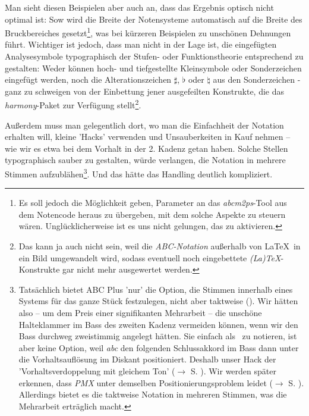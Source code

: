 Man sieht diesen Beispielen aber auch an, dass das Ergebnis optisch nicht
optimal ist: Sow wird die Breite der Notensysteme automatisch auf die Breite des
Bruckbereiches gesetzt\footnote{Es soll jedoch die Möglichkeit geben, Parameter
an das \textit{abcm2ps}-Tool aus dem Notencode heraus zu übergeben, mit dem
solche Aspekte zu steuern wären. Unglücklicherweise ist es uns nicht gelungen,
das zu aktivieren.}, was bei kürzeren Beispielen zu unschönen Dehnungen führt.
\label{AppraisalABC}Wichtiger ist jedoch, dass man nicht in der Lage ist, die
eingefügten Analysesymbole typographisch der Stufen- oder Funktionstheorie
entsprechend zu gestalten: Weder können hoch- und tiefgestellte Kleinsymbole
oder Sonderzeichen eingefügt werden, noch die Alterationszeichen $\sharp$,
$\flat$ oder $\natural$ aus den Sonderzeichen - ganz zu schweigen von der
Einbettung jener ausgefeilten Konstrukte, die das \textit{harmony}-Paket zur
Verfügung stellt\footnote{Das kann ja auch nicht sein, weil die
\textit{ABC-Notation} außerhalb von \LaTeX\ in ein Bild umgewandelt wird, sodass
eventuell noch eingebettete \textit{(La)\TeX}-Konstrukte gar nicht mehr
ausgewertet werden.}.

Außerdem muss man gelegentlich dort, wo man die Einfachheit der Notation
erhalten will, kleine 'Hacks' verwenden und Unsauberkeiten in Kauf nehmen -- wie
wir es etwa bei dem Vorhalt in der 2. Kadenz getan haben. Solche Stellen
typographisch sauber zu gestalten, würde verlangen, die Notation in mehrere
Stimmen aufzublähen\footnote{Tatsächlich bietet ABC Plus 'nur' die Option, die
Stimmen innerhalb eines Systems für das ganze Stück festzulegen, nicht aber
taktweise (\cite[vgl.][49f]{Gonzato2018b}). Wir hätten also -- um dem Preis einer
signifikanten Mehrarbeit -- die unschöne Halteklammer im Bass des zweiten Kadenz
vermeiden können, wenn wir den Bass durchweg zweistimmig angelegt hätten. Sie
einfach als \Halb\ zu notieren, ist aber keine Option, weil \textit{abc} den
folgenden Schlussakkord im Bass dann unter die Vorhaltsauflösung im Diskant
positioniert. Deshalb unser Hack der 'Vorhaltsverdoppelung mit gleichem Ton'
($\rightarrow$ S. ). Wir werden später erkennen, dass
\textit{PMX} unter demselben Positionierungsproblem leidet ($\rightarrow$ S.
). Allerdings bietet es die taktweise Notation in
mehreren Stimmen, was die Mehrarbeit erträglich macht.
}. Und das hätte das Handling deutlich kompliziert.

